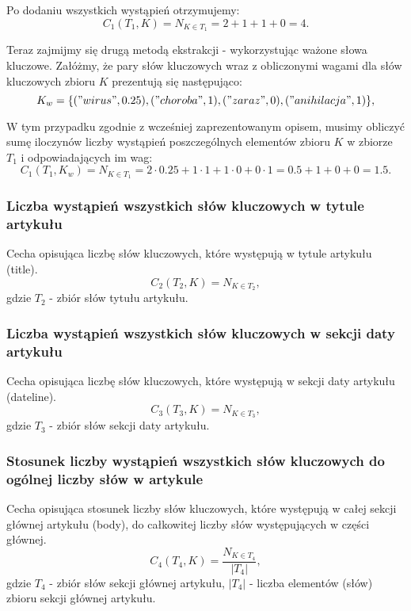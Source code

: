 \documentclass{classrep}
\begin{document}
Po dodaniu wszystkich wystąpień otrzymujemy:
\begin{equation}
 C_{1}(T_{1},K) =  N_{K \in T_{1}} = 2+1+1+0= 4.
 \end{equation}	

Teraz zajmijmy się drugą metodą ekstrakcji - wykorzystując ważone słowa kluczowe. Załóżmy, że pary słów kluczowych wraz z obliczonymi wagami dla słów kluczowych zbioru $K$ prezentują się następująco:
\begin{equation}
K_{w} = \{{("wirus", 0.25), ("choroba", 1), ("zaraz", 0), ("anihilacja", 1)}\},
 \end{equation}	

W tym przypadku zgodnie z wcześniej zaprezentowanym opisem, musimy obliczyć sumę iloczynów liczby wystąpień poszczególnych elementów zbioru $K$ w zbiorze $T_{1}$ i odpowiadających im wag:
\begin{equation}
 C_{1}(T_{1},K_{w}) =  N_{K \in T_{1}} = 2 \cdot 0.25 + 1 \cdot 1 + 1 \cdot 0 + 0 \cdot 1 = 0.5 + 1 + 0 + 0 = 1.5.
 \end{equation}	

\subsubsection{Liczba wystąpień wszystkich słów kluczowych w tytule artykułu}
Cecha opisująca liczbę słów kluczowych, które występują w tytule artykułu (title).
\begin{equation}
            C_{2}(T_{2},K) = N_{K \in T_{2}},
 \end{equation}	
 gdzie $T_{2}$ - zbiór słów tytułu artykułu.

\subsubsection{Liczba wystąpień wszystkich słów kluczowych w sekcji daty artykułu}

Cecha opisująca liczbę słów kluczowych, które występują w sekcji daty artykułu (dateline).
\begin{equation}
            C_{3}(T_{3},K) = N_{K \in T_{3}},
 \end{equation}	
 gdzie $T_{3}$ - zbiór słów sekcji daty artykułu.

\subsubsection{Stosunek liczby wystąpień wszystkich słów kluczowych do ogólnej liczby słów w artykule}
Cecha opisująca stosunek liczby słów kluczowych, które występują w całej sekcji głównej artykułu (body), do całkowitej liczby słów występujących w części głównej.
\begin{equation}
            C_{4}(T_{4},K) = \frac{N_{K \in T_{4}}} {|T_{4}|},
 \end{equation}	
 gdzie $T_{4}$ - zbiór słów sekcji głównej artykułu, $|T_{4}|$ - liczba elementów (słów) zbioru sekcji głównej artykułu.
\end{document}
